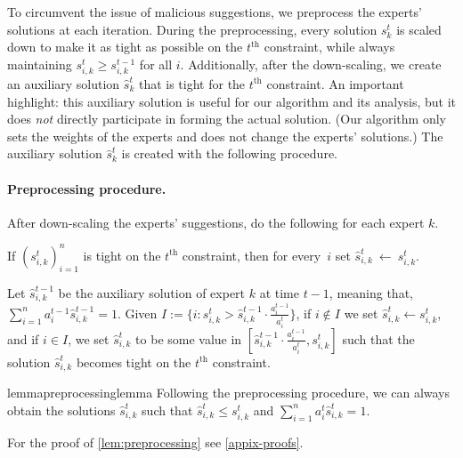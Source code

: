 To circumvent the issue of malicious suggestions, we preprocess the experts' solutions at each iteration. During the preprocessing, every solution $s_k^t$ is scaled down to make it as tight as possible on the $t^{\text{th}}$ constraint, while always maintaining $s_{i,k}^{t} \geq s_{i,k}^{t-1}$ for all $i$. Additionally, after the down-scaling, we create an auxiliary solution $\hat{s}_k^t$ that is tight for the $t^{\text{th}}$ constraint. An important highlight: this auxiliary solution is useful for our algorithm and its analysis, but it does \emph{not} directly participate in forming the actual solution. (Our algorithm only sets the weights of the experts and does not change the experts' solutions.) The auxiliary solution $\hat{s}_k^t$ is created with the following procedure.

\break

\paragraph{Preprocessing procedure.} After down-scaling the experts' suggestions, do the following for each expert $k$.
\begin{compactenum}
	\item If $(s_{i,k}^{t})_{i=1}^{n}$ is tight on the $t^{\text{th}}$ constraint, then for every~$i$ set $\hat{s}_{i,k}^{t}~\gets~s_{i,k}^{t}$.
	\item Let $\hat{s}_{i,k}^{t-1}$ be the auxiliary solution of expert $k$ at time $t-1$, meaning that, $\sum_{i=1}^{n} a_{i}^{t-1} \hat{s}_{i,k}^{t-1} = 1$. Given $I := \{i: s_{i,k}^{t} > \hat{s}_{i,k}^{t-1} \cdot \frac{a_{i}^{t-1}}{a_{i}^{t}} \}$, if $i \notin I$
	we set $\hat{s}_{i,k}^{t} \gets s_{i,k}^{t}$, and if $i \in I$, we set $\hat{s}_{i,k}^{t}$ to be some value in $[\hat{s}_{i,k}^{t-1} \cdot \frac{a_{i}^{t-1}}{a_{i}^{t}}, s_{i,k}^{t}]$ such that the solution $\hat{s}_{i,k}^{t}$
	becomes tight on the $t^{\text{th}}$ constraint.
\end{compactenum}

\begin{restatable}{lemma}{preprocessinglemma}
	\label{lem:preprocessing}
	Following the preprocessing procedure, we can always obtain the solutions $\hat{s}_{i,k}^{t}$ such that
	$\hat{s}_{i,k}^{t} \leq s_{i,k}^{t}$ and $\sum_{i=1}^{n} a_{i}^{t} \hat{s}_{i,k}^{t} = 1$.
\end{restatable}
For the proof of \cref{lem:preprocessing} see \cref{appix-proofs}.

